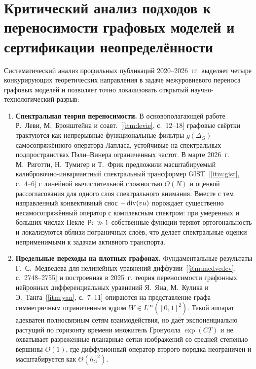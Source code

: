 \section{Критический анализ подходов к переносимости графовых моделей и сертификации неопределённости}

Систематический анализ профильных публикаций 2020--2026~гг. выделяет четыре конкурирующих теоретических направления в задаче межуровневого переноса графовых моделей и позволяет точно локализовать открытый научно-технологический разрыв:
\begin{enumerate}
    \item \textbf{Спектральная теория переносимости.} В основополагающей работе Р.~Леви, М.~Бронштейна и соавт.~[\ref{itm:levie}, с.~12--18] графовые свёртки трактуются как непрерывные функциональные фильтры $g(\Delta_G)$ самосопряжённого оператора Лапласа, устойчивые на спектральных подпространствах Пэли--Винера ограниченных частот. В марте 2026~г. М.~Риготти, Н.~Тумигер и Т.~Фрик предложили масштабируемый калибровочно-инвариантный спектральный трансформер GIST~[\ref{itm:gist}, с.~4--6] с линейной вычислительной сложностью $O(N)$ и оценкой рассогласования для одного слоя спектрального внимания. Вместе с тем направленный конвективный снос $-\operatorname{div}(v u)$ порождает существенно несамосопряжённый оператор с комплексным спектром: при умеренных и больших числах Пекле $\operatorname{Pe}\gg 1$ собственные функции теряют ортогональность и локализуются вблизи пограничных слоёв, что делает спектральные оценки неприменимыми к задачам активного транспорта.
    \item \textbf{Предельные переходы на плотных графонах.} Фундаментальные результаты Г.~С.~Медведева для нелинейных уравнений диффузии~[\ref{itm:medvedev}, с.~2748--2755] и построенная в 2025~г. теория переносимости графонных нейронных дифференциальных уравнений Я.~Яна, М.~Кулика и Э.~Танга~[\ref{itm:yan}, с.~7--11] опираются на представление графа симметричным ограниченным ядром $W\in L^\infty([0,1]^2)$. Такой аппарат адекватен полносвязным сетям взаимодействия, но даёт экспоненциально растущий по горизонту времени множитель Гронуолла $\exp(CT)$ и не охватывает разреженные планарные сетки изображений со средней степенью вершины $O(1)$, где диффузионный оператор второго порядка неограничен и масштабируется как $\Theta(h_G^{-2})$.

\end{enumerate}
